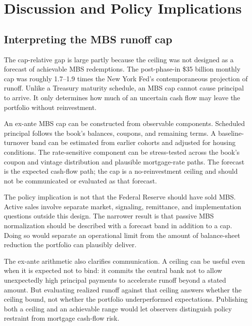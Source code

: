 \section{Discussion and Policy Implications}\label{sec:policy}\label{sec:discussion}\label{sec:discussion-fallout}\label{sec:discussion-capdesign}\label{sec:discussion-policy}\label{sec:abm-danish}\label{tab:danish}

\subsection{Interpreting the MBS runoff cap}

The cap-relative gap is large partly because the ceiling was not designed as a forecast of achievable MBS redemptions. The post-phase-in \$35 billion monthly cap was roughly 1.7--1.9 times the New York Fed's contemporaneous projection of runoff. Unlike a Treasury maturity schedule, an MBS cap cannot cause principal to arrive. It only determines how much of an uncertain cash flow may leave the portfolio without reinvestment.

An ex-ante MBS cap can be constructed from observable components. Scheduled principal follows the book's balances, coupons, and remaining terms. A baseline-turnover band can be estimated from earlier cohorts and adjusted for housing conditions. The rate-sensitive component can be stress-tested across the book's coupon and vintage distribution and plausible mortgage-rate paths. The forecast is the expected cash-flow path; the cap is a no-reinvestment ceiling and should not be communicated or evaluated as that forecast.

The policy implication is not that the Federal Reserve should have sold MBS. Active sales involve separate market, signaling, remittance, and implementation questions outside this design. The narrower result is that passive MBS normalization should be described with a forecast band in addition to a cap. Doing so would separate an operational limit from the amount of balance-sheet reduction the portfolio can plausibly deliver.

The ex-ante arithmetic also clarifies communication. A ceiling can be useful even when it is expected not to bind: it commits the central bank not to allow unexpectedly high principal payments to accelerate runoff beyond a stated amount. But evaluating realized runoff against that ceiling answers whether the ceiling bound, not whether the portfolio underperformed expectations. Publishing both a ceiling and an achievable range would let observers distinguish policy restraint from mortgage cash-flow risk.


